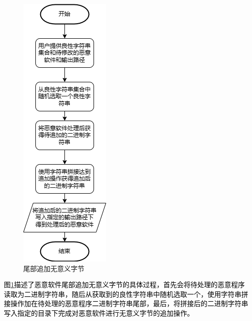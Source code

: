 \begin{figure}[htbp]
  \centering
  \includegraphics[]{images/append_strings.png}
  \caption{尾部追加无意义字节}\label{fig:append_strings}
\end{figure}
\textcolor{black}{图\ref{fig:append_strings}描述了恶意软件尾部追加无意义字节的具体过程，首先会将待处理的恶意程序读取为二进制字符串，随后从获取到的良性字符串中随机选取一个，使用字符串拼接操作加在待处理的恶意程序二进制字符串尾部，最后，将拼接后的二进制字符串写入指定的目录下完成对恶意软件进行无意义字节的追加操作。}

